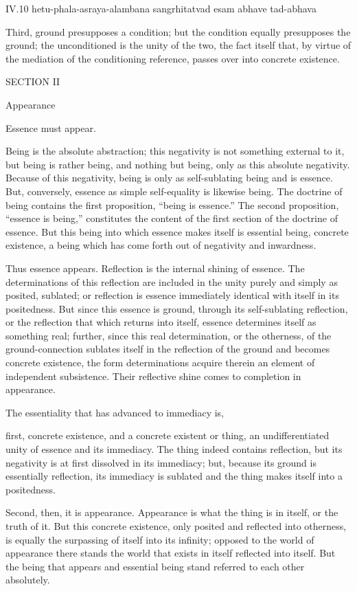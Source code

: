 IV.10
hetu-phala-asraya-alambana sangrhitatvad esam abhave tad-abhava

Third, ground presupposes a condition;
but the condition equally presupposes the ground;
the unconditioned is the unity of the two,
the fact itself that, by virtue of
the mediation of the conditioning reference,
passes over into concrete existence.

SECTION II

Appearance

Essence must appear.

Being is the absolute abstraction;
this negativity is not something external to it,
but being is rather being,
and nothing but being,
only as this absolute negativity.
Because of this negativity,
being is only as self-sublating being
and is essence.
But, conversely, essence as simple self-equality
is likewise being.
The doctrine of being contains the first proposition,
“being is essence.”
The second proposition, “essence is being,”
constitutes the content of the first section
of the doctrine of essence.
But this being into which
essence makes itself
is essential being,
concrete existence,
a being which has come forth
out of negativity and inwardness.

Thus essence appears.
Reflection is the internal shining of essence.
The determinations of this reflection are included
in the unity purely and simply as posited, sublated;
or reflection is essence immediately identical
with itself in its positedness.
But since this essence is ground,
through its self-sublating reflection,
or the reflection that which returns into itself,
essence determines itself as something real;
further, since this real determination, or the otherness,
of the ground-connection sublates itself
in the reflection of the ground
and becomes concrete existence,
the form determinations acquire therein
an element of independent subsistence.
Their reflective shine comes to completion in appearance.

The essentiality that has advanced to immediacy is,

first, concrete existence,
and a concrete existent or thing,
an undifferentiated unity of essence and its immediacy.
The thing indeed contains reflection,
but its negativity is at first dissolved in its immediacy;
but, because its ground is essentially reflection,
its immediacy is sublated
and the thing makes itself into a positedness.

Second, then, it is appearance.
Appearance is what the thing is in itself,
or the truth of it.
But this concrete existence,
only posited and reflected into otherness,
is equally the surpassing of itself into its infinity;
opposed to the world of appearance there stands
the world that exists in itself reflected into itself.
But the being that appears and essential being
stand referred to each other absolutely.

